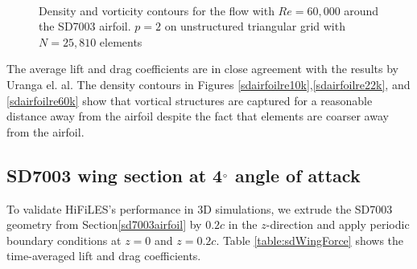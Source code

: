 \begin{figure}[htbp]
\centering
{}
\\

\caption{Density and vorticity contours for the flow with $Re = 60,000$ around the SD7003 airfoil. $p=2$ on unstructured triangular grid with $N = 25,810$ elements}
\label{sdairfoilre60k}
\end{figure}

The average lift and drag coefficients are in close agreement with the results by Uranga el. al\cite{uranga2011implicit}. The density contours in Figures \eqref{sdairfoilre10k},\eqref{sdairfoilre22k}, and \eqref{sdairfoilre60k} show that vortical structures are captured for a reasonable distance away from the airfoil despite the fact that elements are coarser away from the airfoil.


\newpage

\subsection{SD7003 wing section at 4$^{\circ}$ angle of attack}
To validate HiFiLES's performance in 3D simulations, we extrude the SD7003 geometry from Section\eqref{sd7003airfoil} by $0.2c$ in the $z$-direction and apply periodic boundary conditions at $z=0$ and $z=0.2c$. Table \eqref{table:sdWingForce} shows the time-averaged lift and drag coefficients.


